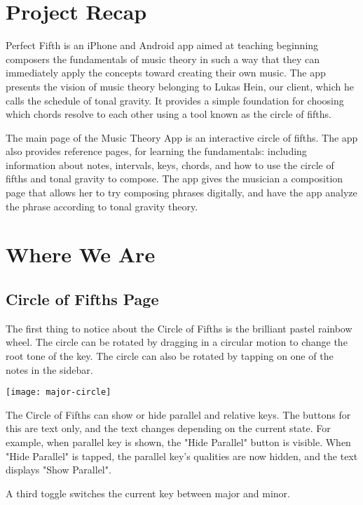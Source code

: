 \documentclass[onecolumn, draftclsnofoot,10pt, compsoc]{IEEEtran}
\begin{document}
\section{Project Recap}

Perfect Fifth is an iPhone and Android app aimed at teaching beginning composers the fundamentals of music theory in such a way that they can immediately apply the concepts toward creating their own music. 
The app presents the vision of music theory belonging to Lukas Hein, our client, which he calls the schedule of tonal gravity. 
It provides a simple foundation for choosing which chords resolve to each other using a tool known as the circle of fifths.

The main page of the Music Theory App is an interactive circle of fifths. The app also provides reference pages, for learning the fundamentals: including information about notes, intervals, keys, chords, and how to use the circle of fifths and tonal gravity to compose.
The app gives the musician a composition page that allows her to try composing phrases digitally, and have the app analyze the phrase according to tonal gravity theory.

\section{Where We Are}

\subsection{Circle of Fifths Page}

The first thing to notice about the Circle of Fifths is the brilliant pastel rainbow wheel.
The circle can be rotated by dragging in a circular motion to change the root tone of the key.
The circle can also be rotated by tapping on one of the notes in the sidebar.

\begin{center}
\texttt{[image: major-circle]}
\end{center}

The Circle of Fifths can show or hide parallel and relative keys.
The buttons for this are text only, and the text changes depending on the current state.
For example, when parallel key is shown, the "Hide Parallel" button is visible.
When "Hide Parallel" is tapped, the parallel key's qualities are now hidden, and the text displays "Show Parallel".

A third toggle switches the current key between major and minor.
\end{document}

